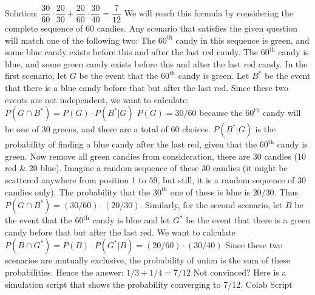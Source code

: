 \begin{enumerate}
Solution: $\dfrac{30}{60} \cdot \dfrac{20}{30}+\dfrac{20}{60} \cdot \dfrac{30}{40} =\dfrac{7}{12}$
We will reach this formula by considering the complete sequence of 60 candies.
Any scenario that satisfies the given question will match one of the following two:
The  $60^{\text{th}}$ candy in this sequence is green, and some blue candy exists before this and after the last red candy.
The $60^{\text{th}}$ candy is blue, and some green candy exists before this and after the last red candy.
In the first scenario, let $G$ be the event that the  $60^{\text{th}}$ candy is green. Let $B^*$ be the event that there is a blue candy before that but after the last red. Since these two events are not independent, we want to calculate:
$P(G \cap B^*) = P(G) \cdot P(B^* | G)$
$P(G) = 30/60$ because the $60^{\text{th}}$ candy will be one of 30 greens, and there are a total of 60 choices.
$P(B^* | G)$ is the probability of finding a blue candy after the last red, given that the $60^{\text{th}}$ candy is green. Now remove all green candies from consideration, there are 30 candies (10 red \& 20 blue). Imagine a random sequence of these 30 candies (it might be scattered anywhere from position 1 to $59$, but still, it is a random sequence of 30 candies only). The probability that the $30^{\text{th}}$ one of these is blue is $20/30$.
Thus $P(G \cap B^*) = (30/60) \cdot (20/30)$.
Similarly, for the second scenario, let $B$ be the event that the $60^{\text{th}}$ candy is blue and let $G^*$ be the event that there is a green candy before that but after the last red. We want to calculate $P(B \cap G^*) = P(B) \cdot P(G^* | B) = (20/60) \cdot (30/40)$
Since these two scenarios are mutually exclusive, the probability of union is the sum of these probabilities.
Hence the answer: $1/3 + 1/4 = 7/12$
Not convinced? Here is a simulation script that shows the probability converging to 7/12.
Colab Script





\end{enumerate}

